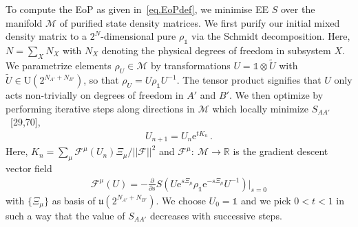 \documentclass[prl,a4paper,notitlepage,twocolumn,superscriptaddress,longbibliography,reprint]{revtex4-2}
\newcommand{\id}{\mathbb{1}} %
\begin{document}
To compute the EoP as given in~\eqref{eq.EoPdef}, we minimise EE $S$ over the manifold $\mathcal{M}$ of purified state density matrices. We first purify our initial mixed density matrix to a $2^N$-dimensional pure $\rho_\id$ via the Schmidt decomposition. Here, $N=\sum_X N_X$ with $N_X$ denoting the physical degrees of freedom in subsystem $X$. We parametrize elements $\rho_U\in\mathcal{M}$ by transformations $U=\id\otimes\widetilde{U}$ with $\widetilde{U}\in\mathrm{U}(2^{N_{A'}+N_{B'}})$, so that $\rho_U=U\rho_\id U^{-1}$. The tensor product signifies that $U$ only acts non-trivially on degrees of freedom in $A'$ and $B'$. We then optimize by performing iterative steps along directions in $\mathcal{M}$ which locally minimize $S_{AA'}$~[29,70],%
\begin{align}
    \label{eq.single_step}
    U_{n+1}=U_n\mathrm{e}^{t K_n}\,.
\end{align}
Here, $K_n=\sum_\mu\mathcal{F}^\mu(U_n)\Xi_\mu/||\mathcal{F}||^2$ and $\mathcal{F}^\mu:~\mathcal{M}\to\mathbb{R}$ is the gradient descent vector field
\begin{align}
    \mathcal{F}^\mu(U)=-\frac{\partial}{\partial s}S(U\mathrm{e}^{s\Xi_\mu}\rho_\id\mathrm{e}^{-s\Xi_\mu}U^{-1})|_{s=0}
\end{align}
with $\{\Xi_\mu\}$ as basis of $\mathfrak{u}(2^{N_{A'}+N_{B'}})$. We choose $U_0=\id$ and we pick $0<t<1$ in such a way that the value of $S_{AA'}$ decreases with successive steps.
\end{document}

